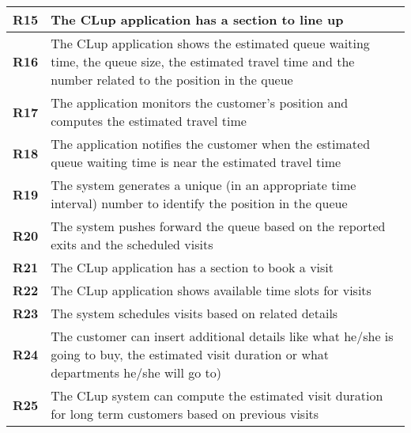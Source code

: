 \begin{center}
{\begin{longtable}{L{2cm}L{12cm}}
        \hline
        \textbf{R15} & The CLup application has a section to line up \\
        \hline
        \textbf{R16} & The CLup application shows the estimated queue waiting time, the queue size, the estimated travel time and the number related to the position in the queue \\
        \hline
        \textbf{R17} & The application monitors the customer's position and computes the estimated travel time \\
        \hline
        \textbf{R18} & The application notifies the customer when the estimated queue waiting time is near the estimated travel time \\
        \hline
        \textbf{R19} & The system generates a unique (in an appropriate time interval) number to identify the position in the queue \\
        \hline
        \textbf{R20} & The system pushes forward the queue based on the reported exits and the scheduled visits \\
        \hline
        \textbf{R21} & The CLup application has a section to book a visit \\
        \hline
        \textbf{R22} & The CLup application shows available time slots for visits \\
        \hline
        \textbf{R23} & The system schedules visits based on related details \\
        \hline
        \textbf{R24} & The customer can insert additional details like what he/she is going to buy, the estimated visit duration or what departments he/she will go to) \\
        \hline
        \textbf{R25} & The CLup system can compute the estimated visit duration for long term customers based on previous visits \\
        \hline
    \end{longtable}}
\end{center}

